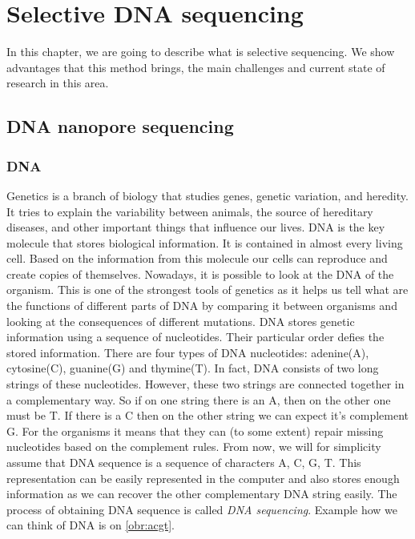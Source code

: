 \chapter{Selective DNA sequencing}

\label{kap:selSeq} %

In this chapter, we are going to describe what is selective sequencing. We
show advantages that this method brings, the main challenges and current state of
research in this area.

\section{DNA nanopore sequencing}

\subsection{DNA}

Genetics is a branch of biology that studies genes, genetic variation, and heredity.
It tries to explain the variability between animals, the source of hereditary diseases, and
other important things that influence our lives. DNA is the key molecule
that stores biological information. It is contained in almost every living cell. Based
on the information from this molecule our cells can reproduce and create copies of
themselves. Nowadays, it is possible to look at the DNA of the organism. This is
one of the strongest tools of genetics as it helps us tell what are the functions
of different parts of DNA by comparing it between organisms and looking at the
consequences of different mutations. DNA stores genetic information using a sequence of
nucleotides. Their particular order defies the stored information. There are four types of DNA nucleotides:
adenine(A), cytosine(C), guanine(G) and thymine(T). In fact, DNA consists of two long
strings of these nucleotides. However, these two strings are connected together
in a complementary way. So if on one string there is an A, then on the other
one must be T. If there is a C then on the other string we can expect
it's complement G. For the organisms it means that they can (to some extent) repair
missing nucleotides based on the complement rules. From now, we will for simplicity
assume that DNA sequence is a sequence of characters A, C, G, T. This representation
can be easily represented in the computer and also stores enough information as we
can recover the other complementary DNA string easily. The process of obtaining DNA
sequence is called \textit{DNA sequencing}. Example how we can think of DNA is on \ref{obr:acgt}.

